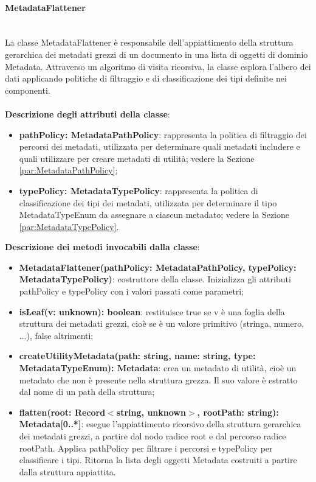 \documentclass[a4paper,12pt]{article}
\begin{document}
{                \paragraph{MetadataFlattener}\label{par:MetadataFlattener}\mbox{}\\
                La classe MetadataFlattener è responsabile dell'appiattimento della struttura gerarchica dei metadati grezzi di un documento in una lista di oggetti di dominio Metadata. Attraverso un algoritmo di visita ricorsiva, la classe esplora l'albero dei dati applicando politiche di filtraggio e di classificazione dei tipi definite nei componenti. \\
                \\
                \textbf{Descrizione degli attributi della classe}:
                \begin{itemize}
                    \item \textbf{pathPolicy: MetadataPathPolicy}: rappresenta la politica di filtraggio dei percorsi dei metadati, utilizzata per determinare quali metadati includere e quali utilizzare per creare metadati di utilità; vedere la Sezione \ref{par:MetadataPathPolicy};
                    \item \textbf{typePolicy: MetadataTypePolicy}: rappresenta la politica di classificazione dei tipi dei metadati, utilizzata per determinare il tipo MetadataTypeEnum da assegnare a ciascun metadato; vedere la Sezione \ref{par:MetadataTypePolicy}.
                \end{itemize}
 
                \noindent \textbf{Descrizione dei metodi invocabili dalla classe}:
                \begin{itemize}
                    \item \textbf{MetadataFlattener(pathPolicy: MetadataPathPolicy, typePolicy: MetadataTypePolicy)}: costruttore della classe. Inizializza gli attributi pathPolicy e typePolicy con i valori passati come parametri;
                    \item \textbf{isLeaf(v: unknown): boolean}: restituisce true se v è una foglia della struttura dei metadati grezzi, cioè se è un valore primitivo (stringa, numero, ...), false altrimenti;
                    \item \textbf{createUtilityMetadata(path: string, name: string, type: MetadataTypeEnum): Metadata}: crea un metadato di utilità, cioè un metadato che non è presente nella struttura grezza. Il suo valore è estratto dal nome di un path della struttura;
                    \item \textbf{flatten(root: Record$<$string, unknown$>$, rootPath: string): Metadata[0..*]}: esegue l'appiattimento ricorsivo della struttura gerarchica dei metadati grezzi, a partire dal nodo radice root e dal percorso radice rootPath. Applica pathPolicy per filtrare i percorsi e typePolicy per classificare i tipi. Ritorna la lista degli oggetti Metadata costruiti a partire dalla struttura appiattita.
                \end{itemize}

}
\end{document}
